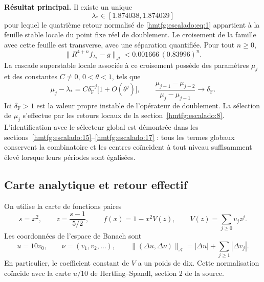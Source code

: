 \textbf{Résultat principal.} Il existe un unique
\begin{equation}
\lambda_*\in[1.874038,1.874039]
\label{hmtfg:escalado:eq:2}
\end{equation}
pour lequel le quatrième retour normalisé de \eqref{hmtfg:escalado:eq:1} appartient à la feuille stable locale du point fixe réel de doublement. Le croisement de la famille avec cette feuille est transverse, avec une séparation quantifiée. Pour tout \(n\ge0\),
\begin{equation}
\boxed{\|R^{4+n}f_{\lambda_*}-g\|_{\mathcal A}
<0.001666\,(0.83996)^n.}
\label{hmtfg:escalado:eq:3}
\end{equation}
La cascade superstable locale associée à ce croisement possède des paramètres \(\mu_j\) et des constantes \(C\ne0\), \(0<\theta<1\), tels que
\begin{equation}
\mu_j-\lambda_*=C\delta_{\mathrm F}^{-j}\bigl[1+O(\theta^j)\bigr],
\qquad
\frac{\mu_{j-1}-\mu_{j-2}}{\mu_j-\mu_{j-1}}\longrightarrow\delta_{\mathrm F}.
\label{hmtfg:escalado:eq:4}
\end{equation}
Ici \(\delta_{\mathrm F}>1\) est la valeur propre instable de l’opérateur de doublement. La sélection de \(\mu_j\) s’effectue par les retours locaux de la section~\ref{hmtfg:escalado:8}. L’identification avec le sélecteur global est démontrée dans les sections~\ref{hmtfg:escalado:15}--\ref{hmtfg:escalado:17} : tous les termes globaux conservent la combinatoire et les centres coïncident à tout niveau suffisamment élevé lorsque leurs périodes sont égalisées.


\subsection{Carte analytique et retour effectif}
\label{hmtfg:escalado:2}

On utilise la carte de fonctions paires
\[
s=x^2,\qquad z=\frac{s-1}{5/2},\qquad
f(x)=1-x^2V(z),\qquad V(z)=\sum_{j\ge0}v_jz^j.
\]
Les coordonnées de l’espace de Banach sont
\begin{equation}
u=10v_0,\qquad \nu=(v_1,v_2,\ldots),\qquad
\|(\Delta u,\Delta\nu)\|_{\mathcal A}
=|\Delta u|+\sum_{j\ge1}|\Delta v_j|.
\label{hmtfg:escalado:eq:5}
\end{equation}
En particulier, le coefficient constant de \(V\) a un poids de dix. Cette normalisation coïncide avec la carte \(u/10\) de Hertling–Spandl, section 2 de la source.

